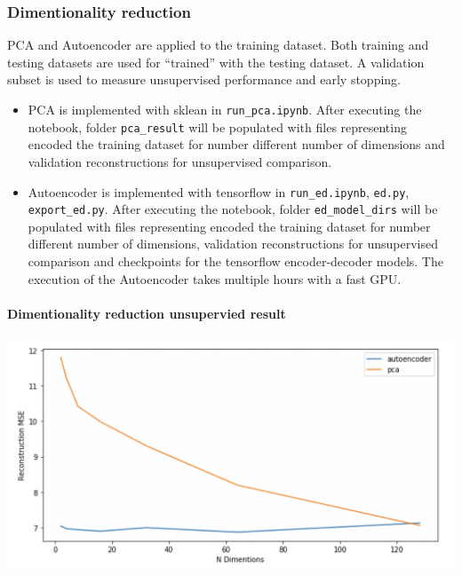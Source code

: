 \documentclass[11pt]{article}
\makeatletter
\def\maxwidth{\ifdim\Gin@nat@width>\linewidth\linewidth
    \else\Gin@nat@width\fi}
\let\Oldincludegraphics\includegraphics
\renewcommand{\includegraphics}[1]{\Oldincludegraphics[width=.8\maxwidth]{#1}}
\providecommand{\tightlist}{%
      \setlength{\itemsep}{0pt}\setlength{\parskip}{0pt}}
\makeatother
\begin{document}
    \hypertarget{dimentionality-reduction}{%
\subsubsection{Dimentionality
reduction}\label{dimentionality-reduction}}

PCA and Autoencoder are applied to the training dataset. Both training
and testing datasets are used for ``trained'' with the testing dataset.
A validation subset is used to measure unsupervised performance and
early stopping.

\begin{itemize}
\tightlist
\item
  PCA is implemented with sklean in \texttt{run\_pca.ipynb}. After
  executing the notebook, folder \texttt{pca\_result} will be populated
  with files representing encoded the training dataset for number
  different number of dimensions and validation reconstructions for
  unsupervised comparison.
\item
  Autoencoder is implemented with tensorflow in \texttt{run\_ed.ipynb},
  \texttt{ed.py}, \texttt{export\_ed.py}. After executing the notebook,
  folder \texttt{ed\_model\_dirs} will be populated with files
  representing encoded the training dataset for number different number
  of dimensions, validation reconstructions for unsupervised comparison
  and checkpoints for the tensorflow encoder-decoder models. The
  execution of the Autoencoder takes multiple hours with a fast GPU.
\end{itemize}

\hypertarget{dimentionality-reduction-unsupervied-result}{%
\paragraph{Dimentionality reduction unsupervied
result}\label{dimentionality-reduction-unsupervied-result}}

\includegraphics{images/2.png}
\end{document}
